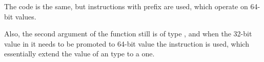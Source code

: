 The code is the same, but instructions with  prefix are used, which operate 
on 64-bit values.

Also, the second argument of the function still is of type , and when the 32-bit value in it 
needs to be promoted to 64-bit value the  instruction is used, 
which essentially extend the value of an  type to a  one.


